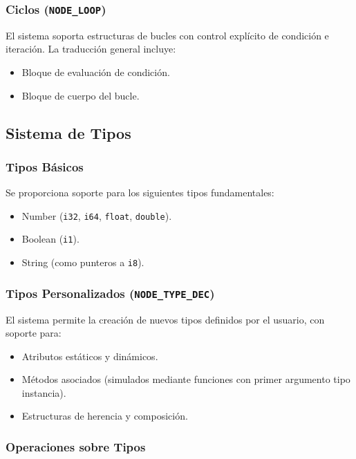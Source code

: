 \documentclass{llncs}
\begin{document}
\subsubsection{Ciclos (\texttt{NODE\_LOOP})}

El sistema soporta estructuras de bucles con control explícito de condición e iteración. La traducción general incluye:
\begin{itemize}
    \item Bloque de evaluación de condición.
    \item Bloque de cuerpo del bucle.
\end{itemize}

\subsection{Sistema de Tipos}

\subsubsection{Tipos Básicos}

Se proporciona soporte para los siguientes tipos fundamentales:
\begin{itemize}
    \item Number (\texttt{i32}, \texttt{i64}, \texttt{float}, \texttt{double}).
    \item Boolean (\texttt{i1}).
    \item String (como punteros a \texttt{i8}).
\end{itemize}

\subsubsection{Tipos Personalizados (\texttt{NODE\_TYPE\_DEC})}

El sistema permite la creación de nuevos tipos definidos por el usuario, con soporte para:
\begin{itemize}
    \item Atributos estáticos y dinámicos.
    \item Métodos asociados (simulados mediante funciones con primer argumento tipo instancia).
    \item Estructuras de herencia y composición.
\end{itemize}

\subsubsection{Operaciones sobre Tipos}
\end{document}
